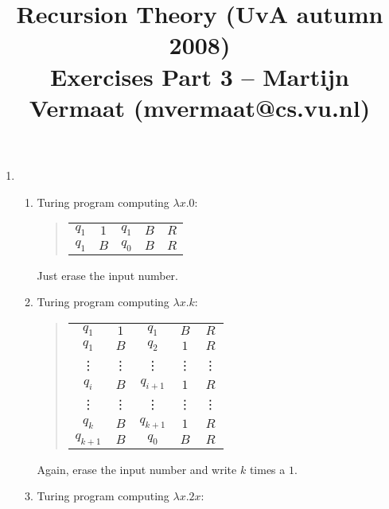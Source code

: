 \documentclass[a4paper,11pt]{article}
\title{Recursion Theory (UvA autumn 2008)\\
\normalsize{Exercises Part 3 -- Martijn Vermaat (mvermaat@cs.vu.nl)}}
\date{}
\begin{document}
\maketitle


\begin{enumerate}


\item %
\begin{enumerate}
\item Turing program computing $\lambda x.0$:

\begin{quote}
\begin{tabular}{ccccc}
  $q_1$ & $1$ & $q_1$ & $B$ & $R$\\
  $q_1$ & $B$ & $q_0$ & $B$ & $R$
\end{tabular}
\end{quote}

Just erase the input number.

\item Turing program computing $\lambda x.k$:

\begin{quote}
\begin{tabular}{ccccc}
  $q_1$ & $1$ & $q_1$ & $B$ & $R$\\
  $q_1$ & $B$ & $q_2$ & $1$ & $R$\\
  \vdots & \vdots & \vdots & \vdots & \vdots\\
  $q_i$ & $B$ & $q_{i+1}$ & $1$ & $R$\\
  \vdots & \vdots & \vdots & \vdots & \vdots\\
  $q_k$ & $B$ & $q_{k+1}$ & $1$ & $R$\\
  $q_{k+1}$ & $B$ & $q_0$ & $B$ & $R$
\end{tabular}
\end{quote}

Again, erase the input number and write $k$ times
a $1$.

\item Turing program computing $\lambda x.2x$:


\end{enumerate}
\end{enumerate}
\end{document}
